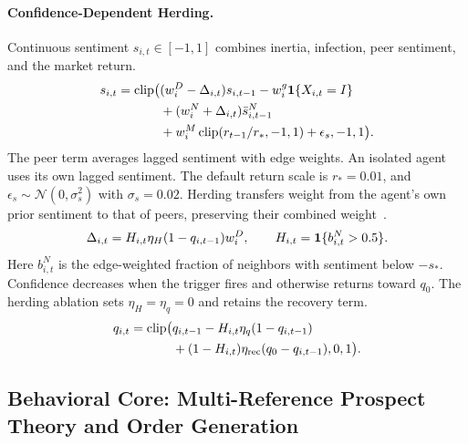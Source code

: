 \paragraph{Confidence-Dependent Herding.} Continuous sentiment $s_{i,t}\in[-1,1]$ combines inertia, infection, peer sentiment, and the market return.
\begin{equation}
\begin{split}s_{i,t}=\operatorname{clip}\bigl(&(w_i^D-\Delta_{i,t})s_{i,t-1}-w_i^g\mathbf{1}\{X_{i,t}=I\}\\&+(w_i^N+\Delta_{i,t})\bar s^N_{i,t-1}\\&+w_i^M\operatorname{clip}(r_{t-1}/r_*,-1,1)+\epsilon_s,-1,1\bigr).\end{split}
  \label{eq:sentiment_update}
\end{equation}
The peer term averages lagged sentiment with edge weights. An isolated agent uses its own lagged sentiment. The default return scale is $r_*=0.01$, and $\epsilon_s\sim\mathcal N(0,\sigma_s^2)$ with $\sigma_s=0.02$. Herding transfers weight from the agent's own prior sentiment to that of peers, preserving their combined weight~\cite{deutsch1955study}.
\begin{equation}
\Delta_{i,t}=H_{i,t}\eta_H(1-q_{i,t-1})w_i^D,\qquad H_{i,t}=\mathbf{1}\{b^N_{i,t}>0.5\}.
  \label{eq:herding_shift}
\end{equation}
Here $b^N_{i,t}$ is the edge-weighted fraction of neighbors with sentiment below $-s_*$. Confidence decreases when the trigger fires and otherwise returns toward $q_0$. The herding ablation sets $\eta_H=\eta_q=0$ and retains the recovery term.
\begin{equation}
\begin{split}q_{i,t}=\operatorname{clip}\bigl(&q_{i,t-1}-H_{i,t}\eta_q(1-q_{i,t-1})\\&+(1-H_{i,t})\eta_{\rm rec}(q_0-q_{i,t-1}),0,1\bigr).\end{split}
  \label{eq:confidence_update}
\end{equation}


\subsection{Behavioral Core: Multi-Reference Prospect Theory and Order Generation}
\label{sec:method:behavior}

